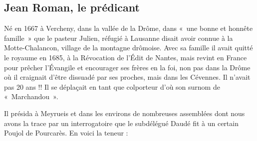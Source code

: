 \subsection{Jean Roman, le prédicant}

\vspace{0.35em}

Né en 1667 à Vercheny, dans la vallée de la Drôme, dans «~une bonne et honnête famille~» que le pasteur Julien, réfugié à Lausanne disait avoir connue à la Motte-Chalancon, village de la montagne drômoise. Avec sa famille il avait quitté le royaume en 1685, à la Révocation de l’Édit de Nantes, mais revint en France pour prêcher l’Évangile et encourager ses frères en la foi, non pas dans la Drôme où il craignait d’être dissuadé par ses proches, mais dans les Cévennes. Il n’avait pas 20 ans !! Il se déplaçait en tant que colporteur d’où son surnom de «~Marchandou~».

Il présida à Meyrueis et dans les environs de nombreuses assemblées dont nous avons la trace par un interrogatoire que le subdélégué Daudé fit à un certain Poujol de Pourcarès. En voici la teneur :

\vspace{15mm}


